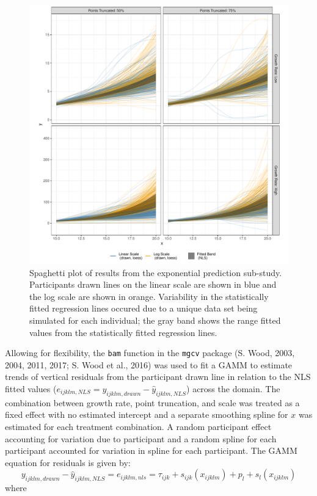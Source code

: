 \documentclass[print]{nuthesis}
\begin{document}
\begin{figure}[tbp]

{\centering \includegraphics[width=1\linewidth,]{thesis_files/figure-latex/exponential-yloess-spaghetti-plot-1} 

}

\caption[Exponential prediction spaghetti plot]{Spaghetti plot of results from the exponential prediction sub-study. Participants drawn lines on the linear scale are shown in blue and the log scale are shown in orange. Variability in the statistically fitted regression lines occured due to a unique data set being simulated for each individual; the gray band shows the range fitted values from the statistically fitted regression lines.}\label{fig:exponential-yloess-spaghetti-plot}
\end{figure}

Allowing for flexibility, the \texttt{bam} function in the \texttt{mgcv} package (S. Wood, 2003, 2004, 2011, 2017; S. Wood et al., 2016) was used to fit a GAMM to estimate trends of vertical residuals from the participant drawn line in relation to the NLS fitted values (\(e_{ijklm,NLS} = y_{ijklm,drawn} - \hat y_{ijklm,NLS}\)) across the domain.
The combination between growth rate, point truncation, and scale was treated as a fixed effect with no estimated intercept and a separate smoothing spline for \(x\) was estimated for each treatment combination.
A random participant effect accounting for variation due to participant and a random spline for each participant accounted for variation in spline for each participant.
The GAMM equation for residuals is given by:
\begin{equation}
y_{ijklm,drawn} - \hat y_{ijklm,NLS} = e_{ijklm,nls} = \tau_{ijk} + s_{ijk}(x_{ijklm}) + p_{l} + s_{l}(x_{ijklm})
\end{equation}
\noindent where
\end{document}
